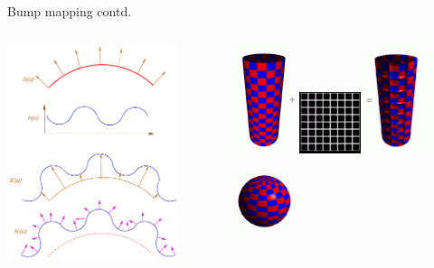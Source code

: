 \documentclass[9pt]{beamer}
\begin{document}
\begin{frame}{Bump mapping contd.}
	
	\begin{columns}[t]
		\begin{column}{5cm}
			\begin{center}
				\includegraphics[width=5cm]{slike/03_bump_mapping.png}
			\end{center}
		\end{column}
		\begin{column}{7cm}
			\begin{center}
				\includegraphics[width=1.8cm]{slike/bump_01.png}
				\includegraphics[width=1.8cm]{slike/bump_02.png}
				\includegraphics[width=1.8cm]{slike/bump_03.png}
			\end{center}
			\begin{center}
				\includegraphics[width=1.8cm]{slike/bump_01_01.png}

\end{center}
\end{column}
\end{columns}
\end{frame}
\end{document}
